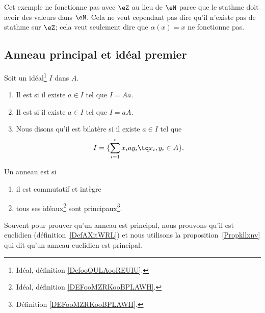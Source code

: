 Cet exemple ne fonctionne pas avec \( \eZ\) au lieu de \( \eN\) parce que le stathme doit avoir des valeurs dans \( \eN\). Cela ne veut cependant pas dire qu'il n'existe pas de stathme sur \( \eZ\); cela veut seulement dire que \( \alpha(x)=x\) ne fonctionne pas.



\subsection{Anneau principal et idéal premier}


\begin{definition}      \label{DEFooMZRKooBPLAWH}
	Soit un idéal\footnote{Idéal, définition \ref{DefooQULAooREUIU}.} \( I\) dans \( A\).
	\begin{enumerate}
		\item
		      Il est  si il existe \( a\in I\) tel que \( I= A a\).
		\item
		      Il est  si il existe \( a\in I\) tel que \( I=a A\).
		\item
		      Nous disons qu'il est  bilatère si il existe \( a\in I\) tel que
		      \begin{equation}
			      I=\{ \sum_{i=1}^rx_iay_i\tq x_i,y_i\in A \}.
		      \end{equation}
	\end{enumerate}
\end{definition}

\begin{definition}          \label{DEFooGWOZooXzUlhK}
	Un anneau est  si
	\begin{enumerate}
		\item
		      il est commutatif et intègre
		\item
		      tous ses idéaux\footnote{Idéal, définition \ref{DEFooMZRKooBPLAWH}.} sont principaux\footnote{Définition \ref{DEFooMZRKooBPLAWH}.}.
	\end{enumerate}
\end{definition}

Souvent pour prouver qu'un anneau est principal, nous prouvons qu'il est euclidien (définition~\ref{DefAXitWRL}) et nous utilisons la proposition~\ref{Propkllxnv} qui dit qu'un anneau euclidien est principal.

